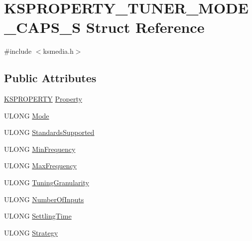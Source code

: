 \hypertarget{struct_k_s_p_r_o_p_e_r_t_y___t_u_n_e_r___m_o_d_e___c_a_p_s___s}{}\section{K\+S\+P\+R\+O\+P\+E\+R\+T\+Y\+\_\+\+T\+U\+N\+E\+R\+\_\+\+M\+O\+D\+E\+\_\+\+C\+A\+P\+S\+\_\+S Struct Reference}
\label{struct_k_s_p_r_o_p_e_r_t_y___t_u_n_e_r___m_o_d_e___c_a_p_s___s}


{\ttfamily \#include $<$ksmedia.\+h$>$}

\subsection*{Public Attributes}
\begin{DoxyCompactItemize}
\item 
\hyperlink{ks_8h_a4392f77c74e868d813d46c39ada4d660}{K\+S\+P\+R\+O\+P\+E\+R\+TY} \hyperlink{struct_k_s_p_r_o_p_e_r_t_y___t_u_n_e_r___m_o_d_e___c_a_p_s___s_a3044594987a128f1148bae15dc81c62f}{Property}
\item 
U\+L\+O\+NG \hyperlink{struct_k_s_p_r_o_p_e_r_t_y___t_u_n_e_r___m_o_d_e___c_a_p_s___s_a80a21c9d99910808aabd4817a2747376}{Mode}
\item 
U\+L\+O\+NG \hyperlink{struct_k_s_p_r_o_p_e_r_t_y___t_u_n_e_r___m_o_d_e___c_a_p_s___s_ab5366bffbcc4425922529e4c435b238b}{Standards\+Supported}
\item 
U\+L\+O\+NG \hyperlink{struct_k_s_p_r_o_p_e_r_t_y___t_u_n_e_r___m_o_d_e___c_a_p_s___s_aa3a8134cbbaa2df74de4e0d600e9d9df}{Min\+Frequency}
\item 
U\+L\+O\+NG \hyperlink{struct_k_s_p_r_o_p_e_r_t_y___t_u_n_e_r___m_o_d_e___c_a_p_s___s_a6ca556b03eed131102bc2a67204fb1ed}{Max\+Frequency}
\item 
U\+L\+O\+NG \hyperlink{struct_k_s_p_r_o_p_e_r_t_y___t_u_n_e_r___m_o_d_e___c_a_p_s___s_aec2eafe1309dcbd7afb535f1826c7f34}{Tuning\+Granularity}
\item 
U\+L\+O\+NG \hyperlink{struct_k_s_p_r_o_p_e_r_t_y___t_u_n_e_r___m_o_d_e___c_a_p_s___s_adcdf880157d7d3b8e48decf045f42aa9}{Number\+Of\+Inputs}
\item 
U\+L\+O\+NG \hyperlink{struct_k_s_p_r_o_p_e_r_t_y___t_u_n_e_r___m_o_d_e___c_a_p_s___s_a54baa8cc18541f0c53371e090d61a2a7}{Settling\+Time}
\item 
U\+L\+O\+NG \hyperlink{struct_k_s_p_r_o_p_e_r_t_y___t_u_n_e_r___m_o_d_e___c_a_p_s___s_a338c79f99dadd9248fb564e0fbce6a00}{Strategy}
\end{DoxyCompactItemize}


